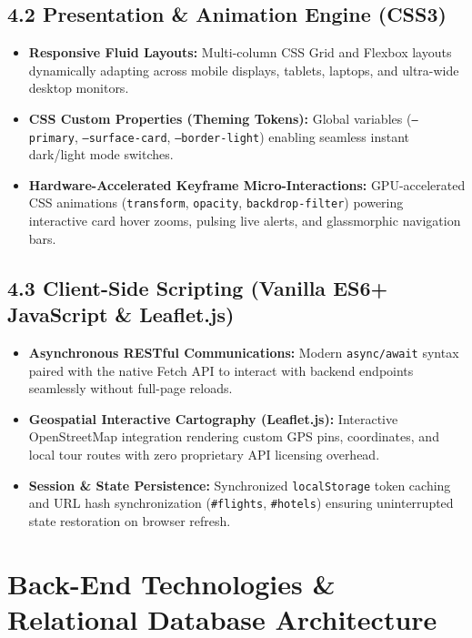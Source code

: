 \documentclass[11pt,a4paper]{article}
\begin{document}
\subsection{4.2 Presentation \& Animation Engine (CSS3)}
\begin{itemize}[leftmargin=*]
    \item \textbf{Responsive Fluid Layouts:} Multi-column CSS Grid and Flexbox layouts dynamically adapting across mobile displays, tablets, laptops, and ultra-wide desktop monitors.
    \item \textbf{CSS Custom Properties (Theming Tokens):} Global variables (\texttt{--primary}, \texttt{--surface-card}, \texttt{--border-light}) enabling seamless instant dark/light mode switches.
    \item \textbf{Hardware-Accelerated Keyframe Micro-Interactions:} GPU-accelerated CSS animations (\texttt{transform}, \texttt{opacity}, \texttt{backdrop-filter}) powering interactive card hover zooms, pulsing live alerts, and glassmorphic navigation bars.
\end{itemize}

\subsection{4.3 Client-Side Scripting (Vanilla ES6+ JavaScript \& Leaflet.js)}
\begin{itemize}[leftmargin=*]
    \item \textbf{Asynchronous RESTful Communications:} Modern \texttt{async/await} syntax paired with the native Fetch API to interact with backend endpoints seamlessly without full-page reloads.
    \item \textbf{Geospatial Interactive Cartography (Leaflet.js):} Interactive OpenStreetMap integration rendering custom GPS pins, coordinates, and local tour routes with zero proprietary API licensing overhead.
    \item \textbf{Session \& State Persistence:} Synchronized \texttt{localStorage} token caching and URL hash synchronization (\texttt{\#flights}, \texttt{\#hotels}) ensuring uninterrupted state restoration on browser refresh.
\end{itemize}

\section{Back-End Technologies \& Relational Database Architecture}
\end{document}
